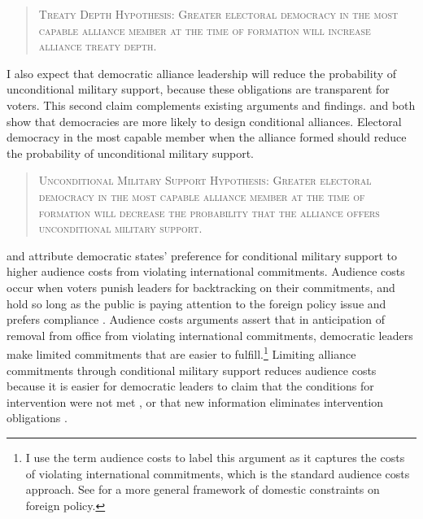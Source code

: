 \documentclass[12pt]{article}
\begin{document}
\begin{quote}
\textsc{Treaty Depth Hypothesis: Greater electoral democracy in the most capable alliance member at the time of formation will increase alliance treaty depth.}
\end{quote}   


I also expect that democratic alliance leadership will reduce the probability of unconditional military support, because these obligations are transparent for voters. 
This second claim complements existing arguments and findings. 
\citet{Mattes2012} and \citet{Chibaetal2015} both show that democracies are more likely to design conditional alliances. 
Electoral democracy in the most capable member when the alliance formed should reduce the probability of unconditional military support.


\begin{quote}
\textsc{Unconditional Military Support Hypothesis: Greater electoral democracy in the most capable alliance member at the time of formation will decrease the probability that the alliance offers unconditional military support.}
\end{quote} 


\citet{Mattes2012} and \citet{Chibaetal2015} attribute democratic states' preference for conditional military support to higher audience costs from violating international commitments. 
Audience costs occur when voters punish leaders for backtracking on their commitments, and hold so long as the public is paying attention to the foreign policy issue \citep{Slantchev2006, PotterBaum2014} and prefers compliance \citep{Chaudoin2014, KertzerBrutger2016}.  
Audience costs arguments assert that in anticipation of removal from office from violating international commitments, democratic leaders make limited commitments that are easier to fulfill.\footnote{I use the term audience costs to label this argument as it captures the costs of violating international commitments, which is the standard audience costs approach. See \citet{HydeSaunders2020} for a more general framework of domestic constraints on foreign policy.} 
Limiting alliance commitments through conditional military support reduces audience costs because it is easier for democratic leaders to claim that the conditions for intervention were not met \citep{FjelstulReiter2019}, or that new information eliminates intervention obligations \citep{LevenduskyHorowitz2012}. 
\end{document}
